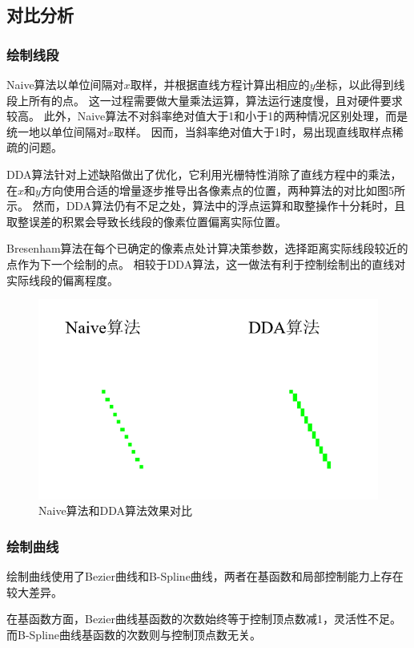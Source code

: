 \documentclass[a4paper,UTF8]{article}
\begin{document}
        
\subsection{对比分析}
\subsubsection{绘制线段}
Naive算法以单位间隔对$x$取样，并根据直线方程计算出相应的$y$坐标，以此得到线段上所有的点。
这一过程需要做大量乘法运算，算法运行速度慢，且对硬件要求较高。
此外，Naive算法不对斜率绝对值大于1和小于1的两种情况区别处理，而是统一地以单位间隔对$x$取样。
因而，当斜率绝对值大于1时，易出现直线取样点稀疏的问题。

DDA算法针对上述缺陷做出了优化，它利用光栅特性消除了直线方程中的乘法，在$x$和$y$方向使用合适的增量逐步推导出各像素点的位置，两种算法的对比如图5所示。
然而，DDA算法仍有不足之处，算法中的浮点运算和取整操作十分耗时，且取整误差的积累会导致长线段的像素位置偏离实际位置。

Bresenham算法在每个已确定的像素点处计算决策参数，选择距离实际线段较近的点作为下一个绘制的点。
相较于DDA算法，这一做法有利于控制绘制出的直线对实际线段的偏离程度。

\begin{figure}[H]
    \centering
    \includegraphics[scale=0.6]{naive-vs-dda.PNG}
    \caption{Naive算法和DDA算法效果对比}
\end{figure}

\subsubsection{绘制曲线}
绘制曲线使用了Bezier曲线和B-Spline曲线，两者在基函数和局部控制能力上存在较大差异。

在基函数方面，Bezier曲线基函数的次数始终等于控制顶点数减1，灵活性不足。
而B-Spline曲线基函数的次数则与控制顶点数无关。
\end{document}
